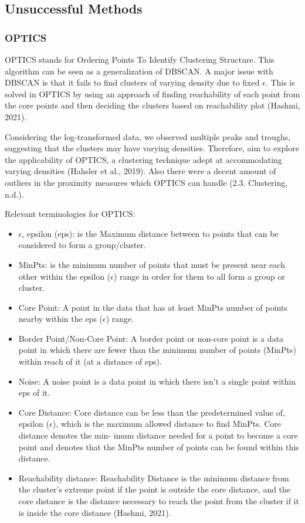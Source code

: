 \documentclass[11pt, a4paper]{article}
\begin{document}
\pagebreak
\subsection{Unsuccessful Methods}\label{appendix:unsuccessful}

\subsubsection{OPTICS}

OPTICS stands for Ordering Points To Identify Clustering Structure. This algorithm can be seen as a generalization of DBSCAN. A major issue with DBSCAN is that it fails to find clusters of varying density due to fixed $\epsilon$. This is solved in OPTICS by using an approach of finding reachability of each point from the core points and then deciding the clusters based on reachability plot (Hashmi, 2021).
\par
Considering the log-transformed data, we observed multiple peaks and troughs, suggesting that the clusters may have varying densities. Therefore, aim to explore the applicability of OPTICS, a clustering technique adept at accommodating varying densities (Hahsler et al., 2019). Also there were a decent amount of outliers in the proximity measures which OPTICS can handle (2.3. Clustering, n.d.).
\par
Relevant terminologies for OPTICS:

\begin{itemize}
\item $\epsilon$, epsilon (eps): is the Maximum distance between to points that can be considered to form a group/cluster.
\item MinPts:  is the minimum number of points that must be present near each other within the epsilon ($\epsilon$) range in order for them to all form a group or cluster.
\item Core Point:  A point in the data that has at least MinPts number of points nearby within the eps ($\epsilon$) range.
\item Border Point/Non-Core Point: A border point or non-core point is a data point in which there are fewer than the minimum number of points (MinPts) within reach of it (at a distance of eps).
\item Noise: A noise point is a data point in which there isn’t a single point within eps of it.
\item Core Distance: Core distance can be less than the predetermined value of, epsilon ($\epsilon$), which is the maximum allowed distance to find MinPts. Core distance denotes the min- imum distance needed for a point to become a core point and denotes that the MinPts number of points can be found within this distance.
\item Reachability distance: Reachability Distance is the minimum distance from the cluster’s extreme point if the point is outside the core distance, and the core distance is the distance necessary to reach the point from the cluster if it is inside the core distance (Hashmi, 2021).
\end{itemize}
\end{document}
